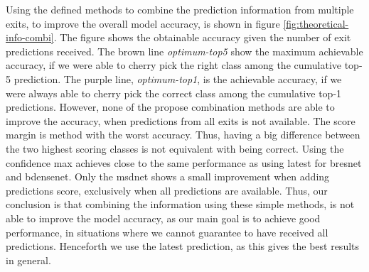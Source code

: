 Using the defined methods to combine the prediction information from multiple exits, to improve the overall model accuracy, is shown in figure \ref{fig:theoretical-info-combi}. The figure shows the obtainable accuracy given the number of exit predictions received. The brown line \textit{optimum-top5} show the maximum achievable accuracy, if we were able to cherry pick the right class among the cumulative top-5 prediction. The purple line, \textit{optimum-top1}, is the achievable accuracy, if we were always able to cherry pick the correct class among the cumulative top-1 predictions. However, none of the propose combination methods are able to improve the accuracy, when predictions from all exits is not available. The score margin is method with the worst accuracy. Thus, having a big difference between the two highest scoring classes is not equivalent with being correct. Using the confidence max achieves close to the same performance as using latest for \gls{bresnet} and \gls{bdensenet}. Only the \gls{msdnet} shows a small improvement when adding predictions score, exclusively when all predictions are available. Thus, our conclusion is that combining the information using these simple methods, is not able to improve the model accuracy, as our main goal is to achieve good performance, in situations where we cannot guarantee to have received all predictions. Henceforth we use the latest prediction, as this gives the best results in general.  

